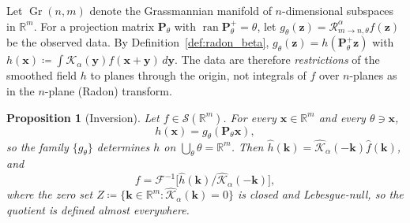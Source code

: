 \documentclass[11pt,a4paper]{article}
\theoremstyle{plain}
\newtheorem{proposition}[theorem]{Proposition}
\theoremstyle{definition}
\theoremstyle{remark}
\numberwithin{equation}{section}
\begin{document}
Let $\operatorname{Gr}(n, m)$ denote the Grassmannian manifold of $n$-dimensional subspaces in $\mathbb{R}^m$. For a projection matrix $\mathbf{P}_\theta$ with $\operatorname{ran}\mathbf{P}_\theta^+ = \theta$, let $g_\theta(\mathbf{z}) = \mathcal{R}_{m \to n, \theta}^\alpha f(\mathbf{z})$ be the observed data. By Definition~\ref{def:radon_beta}, $g_\theta(\mathbf{z}) = h(\mathbf{P}_\theta^+\mathbf{z})$ with $h(\mathbf{x}) \coloneqq \int \mathcal{K}_\alpha(\mathbf{y}) f(\mathbf{x} + \mathbf{y})\,d\mathbf{y}$. The data are therefore \emph{restrictions} of the smoothed field $h$ to planes through the origin, not integrals of $f$ over $n$-planes as in the $n$-plane (Radon) transform.

\begin{proposition}[Inversion]
\label{prop:inversion}
Let $f \in \mathcal{S}(\mathbb{R}^m)$. For every $\mathbf{x} \in \mathbb{R}^m$ and every $\theta \ni \mathbf{x}$,
\begin{equation}
h(\mathbf{x}) = g_\theta(\mathbf{P}_\theta \mathbf{x}),
\end{equation}
so the family $\{g_\theta\}$ determines $h$ on $\bigcup_\theta \theta = \mathbb{R}^m$. Then $\widehat{h}(\mathbf{k}) = \widehat{\mathcal{K}}_\alpha(-\mathbf{k})\widehat{f}(\mathbf{k})$, and
\begin{equation}
f = \mathcal{F}^{-1}\Big[\widehat{h}(\mathbf{k}) / \widehat{\mathcal{K}}_\alpha(-\mathbf{k})\Big],
\end{equation}
where the zero set $Z \coloneqq \{\mathbf{k} \in \mathbb{R}^m \colon \widehat{\mathcal{K}}_\alpha(\mathbf{k}) = 0\}$ is closed and Lebesgue-null, so the quotient is defined almost everywhere.
\end{proposition}
\end{document}
